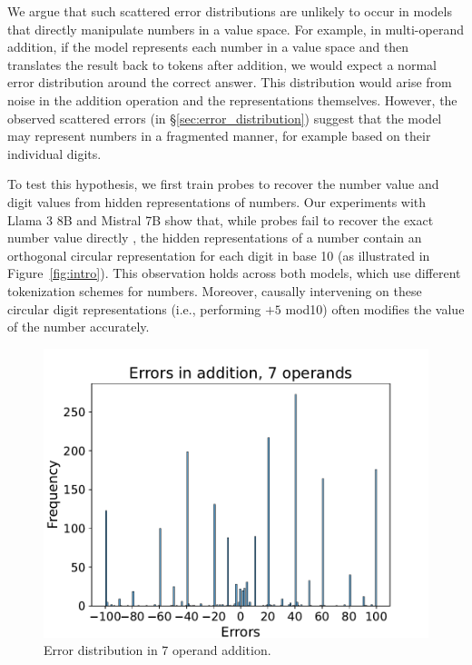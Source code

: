 \documentclass[11pt]{article}
\begin{document}
We argue that such scattered error distributions are unlikely to occur in models that directly manipulate numbers in a value space. For example, in multi-operand addition, if the model represents each number in a value space and then translates the result back to tokens after addition, we would expect a normal error distribution around the correct answer. This distribution would arise from noise in the addition operation and the representations themselves. However, the observed scattered errors (in \S\ref{sec:error_distribution}) suggest that the model may represent numbers in a fragmented manner, for example based on their individual digits.

To test this hypothesis, we first train probes to recover the number value and digit values from hidden representations of numbers. 
Our experiments with Llama 3 8B \citep{dubey2024llama3herdmodels} and Mistral 7B \citep{jiang2023mistral7b} show that, while probes fail to recover the exact number value directly \citep[which agrees with][]{zhu2024languagemodelsknowvalue},
the hidden representations of a number contain an orthogonal circular representation for each digit in base 10 (as illustrated in Figure~\ref{fig:intro}).
This observation holds across both models, which use different tokenization schemes for numbers.
Moreover, causally intervening on these circular digit representations (i.e., performing $+5$ mod10) often modifies the value of the number accurately.

\begin{figure}[t]
\setlength\belowcaptionskip{-10pt}
\centering
   \includegraphics[scale=0.33]{addition_errors.pdf}
  \caption{Error distribution in 7 operand addition.}
    \label{fig:7operand}
\end{figure}
\end{document}
